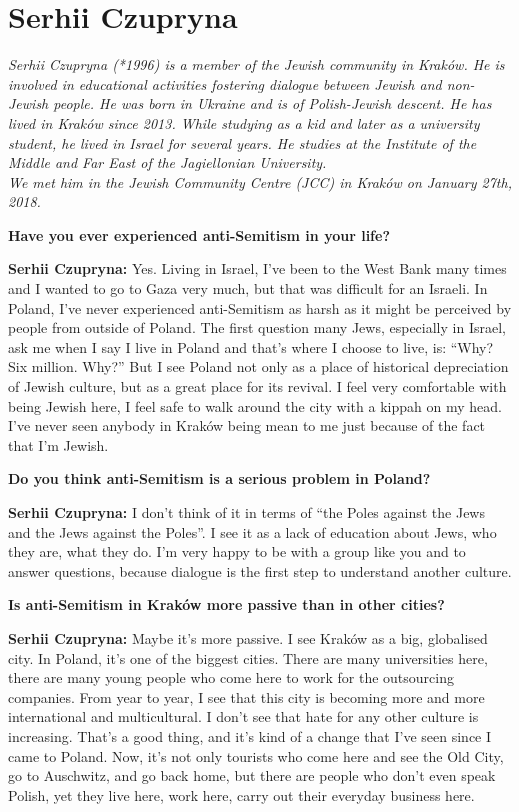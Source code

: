 \section{Serhii Czupryna}

\textit{Serhii Czupryna (*1996) is a member of the Jewish community in Kraków. He is involved in educational activities fostering dialogue between Jewish and non-Jewish people. He was born in Ukraine and is of Polish-Jewish descent. He has lived in Kraków since 2013. While studying as a kid and later as a university student, he lived in Israel for several years. He studies at the Institute of the Middle and Far East of the Jagiellonian University. \\
We met him in the Jewish Community Centre (JCC) in Kraków on January 27th, 2018.}\par
\vspace*{2em}
\textbf{Have you ever experienced anti-Semitism in your life?}\par
\textbf{Serhii Czupryna:} Yes. Living in Israel, I’ve been to the West Bank many times and I wanted to go to Gaza very much, but that was difficult for an Israeli. In Poland, I’ve never experienced anti-Semitism as harsh as it might be perceived by people from outside of Poland. The first question many Jews, especially in Israel, ask me when I say I live in Poland and that’s where I choose to live, is: ``Why? Six million. Why?'' But I see Poland not only as a place of historical depreciation of Jewish culture, but as a great place for its revival. I feel very comfortable with being Jewish here, I feel safe to walk around the city with a kippah on my head. I’ve never seen anybody in Kraków being mean to me just because of the fact that I’m Jewish. \par
\textbf{Do you think anti-Semitism is a serious problem in Poland?}\par 
\textbf{Serhii Czupryna:} I don’t think of it in terms of ``the Poles against the Jews and the Jews against the Poles''. I see it as a lack of education about Jews, who they are, what they do. I’m very happy to be with a group like you and to answer questions, because dialogue is the first step to understand another culture. \par
\textbf{Is anti-Semitism in Kraków more passive than in other cities?}\par
\textbf{Serhii Czupryna:} Maybe it's more passive. I see Kraków as a big, globalised city. In Poland, it’s one of the biggest cities. There are many universities here, there are many young people who come here to work for the outsourcing companies. From year to year, I see that this city is becoming more and more international and multicultural. I don’t see that hate for any other culture is increasing. That’s a good thing, and it's kind of a change that I’ve seen since I came to Poland. Now, it's not only tourists who come here and see the Old City, go to Auschwitz, and go back home, but there are people who don’t even speak Polish, yet they live here, work here, carry out their everyday business here.\par 
